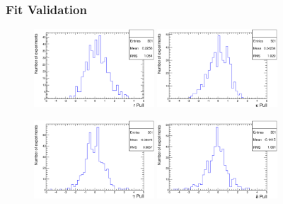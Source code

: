 \documentclass{beamer}
\begin{document}
\begin{frame}
	\frametitle{Fit Validation}

	\centering
	
	\begin{figure}[hp]
	\centering
		\includegraphics[width=0.4\textwidth, height = 3.cm]{plots_toy/r_pull.eps} 
		\includegraphics[width=0.4\textwidth, height = 3.cm]{plots_toy/k_pull.eps} 
		
		\includegraphics[width=0.4\textwidth, height = 3.cm]{plots_toy/gamma_pull.eps} 
		\includegraphics[width=0.4\textwidth, height = 3.cm]{plots_toy/delta_pull.eps} 

		
	\end{figure}		
				
\end{frame}
\end{document}
